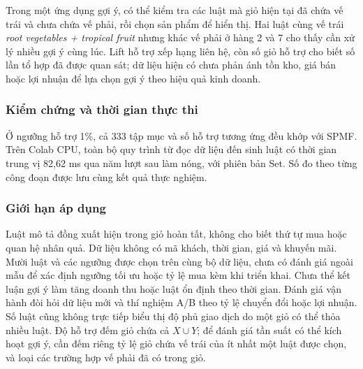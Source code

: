Trong một ứng dụng gợi ý, có thể kiểm tra các luật mà giỏ hiện tại
đã chứa vế trái và chưa chứa vế phải, rồi chọn sản phẩm để hiển thị.
Hai luật cùng vế trái \textit{root vegetables + tropical fruit}
nhưng khác vế phải ở hàng 2 và 7 cho thấy cần xử lý nhiều gợi ý
cùng lúc. Lift hỗ trợ xếp hạng liên hệ, còn số giỏ hỗ trợ cho biết
số lần tổ hợp đã được quan sát; dữ liệu hiện có chưa phản ánh
tồn kho, giá bán hoặc lợi nhuận để lựa chọn gợi ý theo hiệu quả kinh doanh.

\subsubsection{Kiểm chứng và thời gian thực thi}
Ở ngưỡng hỗ trợ 1\%, cả 333 tập mục và số hỗ trợ tương ứng đều khớp
với SPMF. Trên Colab CPU, toàn bộ quy trình từ đọc dữ liệu đến
sinh luật có thời gian trung vị 82,62 ms qua năm lượt sau làm nóng,
với phiên bản Set. Số đo theo từng công đoạn được lưu cùng kết quả thực nghiệm.

\subsubsection{Giới hạn áp dụng}
Luật mô tả đồng xuất hiện trong giỏ hoàn tất, không cho biết thứ tự mua
hoặc quan hệ nhân quả. Dữ liệu không có mã khách, thời gian, giá và khuyến
mãi. Mười luật và các ngưỡng được chọn trên cùng bộ dữ liệu, chưa có đánh giá
ngoài mẫu để xác định ngưỡng tối ưu hoặc tỷ lệ mua kèm khi triển khai.
Chưa thể kết luận gợi ý làm tăng doanh thu hoặc luật ổn định theo thời gian.
Đánh giá vận hành đòi hỏi dữ liệu mới và thí nghiệm A/B theo tỷ lệ
chuyển đổi hoặc lợi nhuận. Số luật cũng không trực tiếp biểu thị độ phủ
giao dịch do một giỏ có thể thỏa nhiều luật. Độ hỗ trợ đếm giỏ chứa cả
$X\cup Y$; để đánh giá tần suất có thể kích hoạt gợi ý, cần đếm riêng
tỷ lệ giỏ chứa vế trái của ít nhất một luật được chọn, và loại các
trường hợp vế phải đã có trong giỏ.
